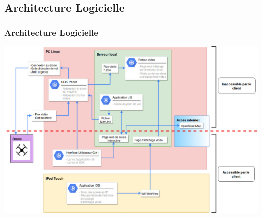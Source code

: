 \documentclass{beamer}
\begin{document}

	\begin{frame}
		\section{Architecture Logicielle}
		\begin{center}
		\frametitle{Architecture Logicielle}
       
        \includegraphics[scale=0.3]{Architecture_logicielle_v2.jpg}
		\end{center}
	\end{frame}
	
	
\end{document}
